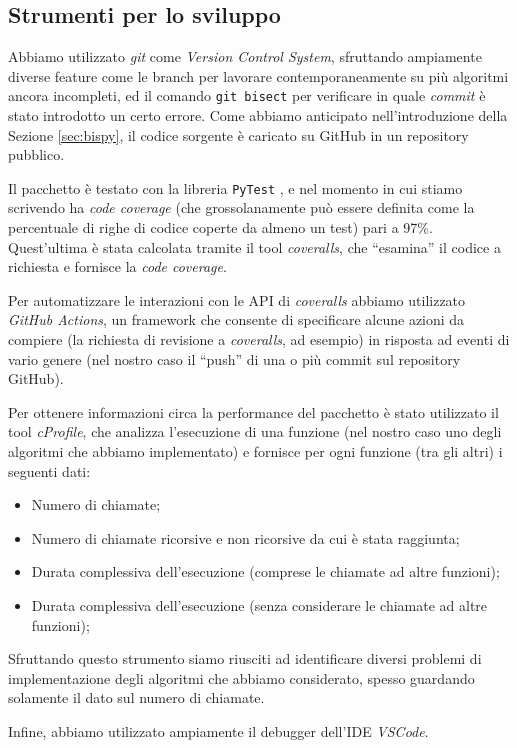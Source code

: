 \subsection{Strumenti per lo sviluppo}
Abbiamo utilizzato \emph{git} come \emph{Version Control System}, sfruttando ampiamente diverse feature come le branch per lavorare contemporaneamente su più algoritmi ancora incompleti, ed il comando \verb|git bisect| per verificare in quale \emph{commit} è stato introdotto un certo errore. Come abbiamo anticipato nell'introduzione della Sezione \ref{sec:bispy}, il codice sorgente è caricato su GitHub in un repository pubblico.

Il pacchetto è testato con la libreria \texttt{PyTest} \cite{pytest}, e nel momento in cui stiamo scrivendo ha \emph{code coverage} (che grossolanamente può essere definita come la percentuale di righe di codice coperte da almeno un test) pari a 97\%. Quest'ultima è stata calcolata tramite il tool \emph{coveralls}, che ``esamina'' il codice a richiesta e fornisce la \emph{code coverage}.

Per automatizzare le interazioni con le API di \emph{coveralls} abbiamo utilizzato \emph{GitHub Actions}, un framework che consente di specificare alcune azioni da compiere (la richiesta di revisione a \emph{coveralls}, ad esempio) in risposta ad eventi di vario genere (nel nostro caso il ``push'' di una o più commit sul repository GitHub).

Per ottenere informazioni circa la performance del pacchetto è stato utilizzato il tool \emph{cProfile}, che analizza l'esecuzione di una funzione (nel nostro caso uno degli algoritmi che abbiamo implementato) e fornisce per ogni funzione (tra gli altri) i seguenti dati:
\begin{itemize}
    \item Numero di chiamate;
    \item Numero di chiamate ricorsive e non ricorsive da cui è stata raggiunta;
    \item Durata complessiva dell'esecuzione (comprese le chiamate ad altre funzioni);
    \item Durata complessiva dell'esecuzione (senza considerare le chiamate ad altre funzioni);
\end{itemize}
Sfruttando questo strumento siamo riusciti ad identificare diversi problemi di implementazione degli algoritmi che abbiamo considerato, spesso guardando solamente il dato sul numero di chiamate.

Infine, abbiamo utilizzato ampiamente il debugger dell'IDE \emph{VSCode}.
